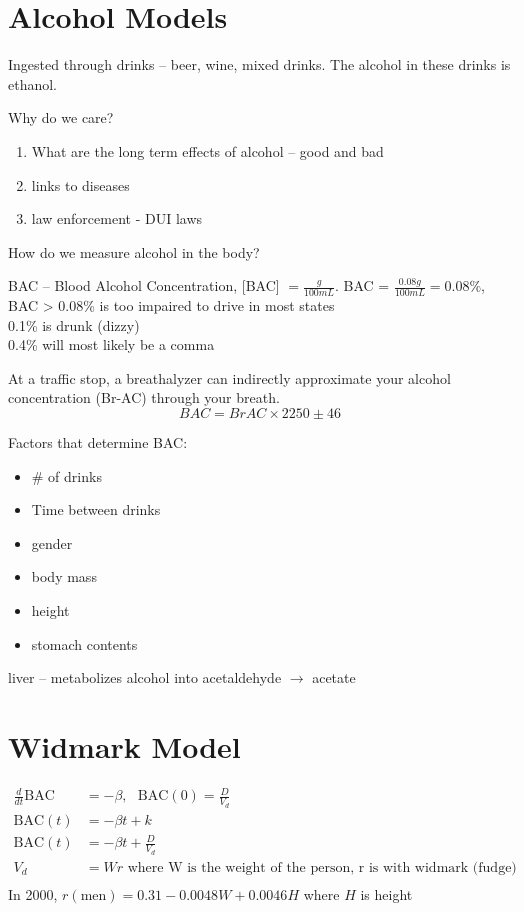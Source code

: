 \documentclass[
	date={October 2{,} 2024},
	month={10},
	day={2}
]{math486notes}
\begin{document}
\tableofcontents

\section{Alcohol Models}\label{sec:alcohol-models}
Ingested through drinks -- beer, wine, mixed drinks.
The alcohol in these drinks is ethanol.

Why do we care?
\begin{enumerate}[label=(\arabic*)]
	\item What are the long term effects of alcohol -- good and bad
	\item links to diseases
	\item law enforcement - DUI laws
\end{enumerate}

How do we measure alcohol in the body?

BAC -- Blood Alcohol Concentration, [BAC] $= \frac{g}{100 mL}$.
BAC = $\frac{0.08 g}{100 mL} = 0.08\%$, BAC > 0.08\% is too impaired to drive in most states\\

0.1\% is drunk (dizzy)\\
0.4\% will most likely be a comma

At a traffic stop, a breathalyzer can indirectly approximate your alcohol concentration (Br-AC) through your breath.
\begin{equation}
	BAC = BrAC \times 2250 \pm 46
	\label{eq:bac}
\end{equation}

Factors that determine BAC:
\begin{itemize}
	\item \# of drinks
	\item Time between drinks
	\item gender
	\item body mass
	\item height
	\item stomach contents
\end{itemize}

liver -- metabolizes alcohol into acetaldehyde $\rightarrow$ acetate

\section{Widmark Model}\label{sec:widmark-model}
\begin{equation}
	\begin{aligned}
		\frac{d}{dt}\mbox{BAC} &= -\beta,\ \ \ \mbox{BAC}(0) = \frac{D}{V_{d}}\\
		\mbox{BAC}(t) &= -\beta t + k\\
		\mbox{BAC}(t) &= -\beta t + \frac{D}{V_{d}}\\
		V_{d} &= Wr \mbox{ where W is the weight of the person, r is with widmark (fudge) factor}\\
	\end{aligned}
	\label{eq:widmark}
\end{equation}
In 2000, $r(\mbox{men}) = 0.31 - 0.0048W + 0.0046H$ where $H$ is height
\end{document}
